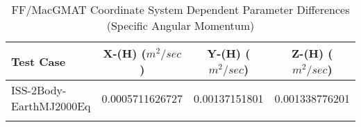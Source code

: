 \begin{table}[htbp!]
\centering
\caption{ FF/MacGMAT Coordinate System Dependent Parameter Differences (Specific Angular Momentum)}
      \begin{tabular}{lccc}
      \hline\hline
          Test Case & X-(H) ($m^2/sec$) & Y-(H) ($m^2/sec$) & Z-(H) ($m^2/sec$) \\
         \hline
         ISS-2Body-EarthMJ2000Eq & 0.0005711626727 & 0.00137151801 & 0.001338776201 \\
      \hline\hline
      \label{Table: FF-MacGMAT CS Parameters Set 3} 
\end{tabular}
\end{table}
